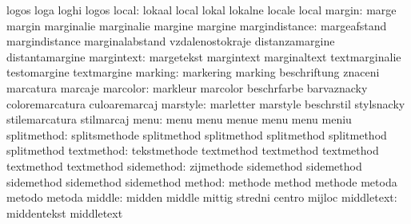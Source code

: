                            logos                     loga
                           loghi                     logos
                    local: lokaal                    local
                           lokal                     lokalne
                           locale                    local
                   margin: marge                     margin
                           marginalie                marginalie
                           margine                   margine
           margindistance: margeafstand              margindistance
                           marginalabstand           vzdalenostokraje
                           distanzamargine           distantamargine
               margintext: margetekst                margintext
                           marginaltext              textmarginalie
                           testomargine              textmargine
                  marking: markering                 marking
                           beschriftung              znaceni
                           marcatura                 marcaje
                 marcolor: markleur                  marcolor
                           beschrfarbe               barvaznacky
                           coloremarcatura           culoaremarcaj
                 marstyle: marletter                 marstyle
                           beschrstil                stylsnacky
                           stilemarcatura            stilmarcaj
                     menu: menu                      menu
                           menue                     menu
                           menu                      meniu
              splitmethod: splitsmethode             splitmethod
                           splitmethod               splitmethod
                           splitmethod               splitmethod
               textmethod: tekstmethode              textmethod
                           textmethod                textmethod
                           textmethod                textmethod
               sidemethod: zijmethode                sidemethod
                           sidemethod                sidemethod
                           sidemethod                sidemethod
                   method: methode                   method
                           methode                   metoda
                           metodo                    metoda
                   middle: midden                    middle
                           mittig                    stredni
                           centro                    mijloc %
               middletext: middentekst               middletext
